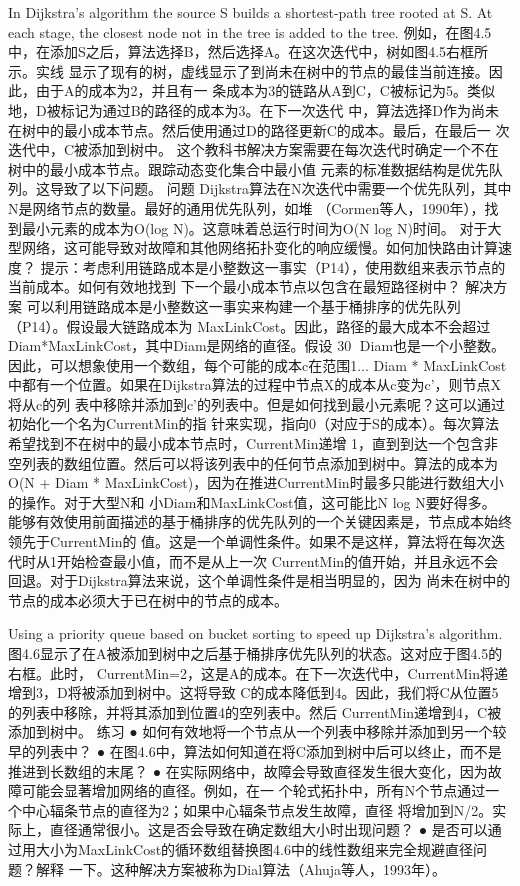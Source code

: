 In Dijkstra’s algorithm the source S builds a shortest-path tree rooted at S. At each stage, the
closest node not in the tree is added to the tree.
例如，在图4.5中，在添加S之后，算法选择B，然后选择A。在这次迭代中，树如图4.5右框所示。实线
显示了现有的树，虚线显示了到尚未在树中的节点的最佳当前连接。因此，由于A的成本为2，并且有一
条成本为3的链路从A到C，C被标记为5。类似地，D被标记为通过B的路径的成本为3。在下一次迭代
中，算法选择D作为尚未在树中的最小成本节点。然后使用通过D的路径更新C的成本。最后，在最后一
次迭代中，C被添加到树中。
这个教科书解决方案需要在每次迭代时确定一个不在树中的最小成本节点。跟踪动态变化集合中最小值
元素的标准数据结构是优先队列。这导致了以下问题。
问题
Dijkstra算法在N次迭代中需要一个优先队列，其中N是网络节点的数量。最好的通用优先队列，如堆
（Cormen等人，1990年），找到最小元素的成本为O(log N)。这意味着总运行时间为O(N log N)时间。
对于大型网络，这可能导致对故障和其他网络拓扑变化的响应缓慢。如何加快路由计算速度？
提示：考虑利用链路成本是小整数这一事实（P14），使用数组来表示节点的当前成本。如何有效地找到
下一个最小成本节点以包含在最短路径树中？
解决方案
可以利用链路成本是小整数这一事实来构建一个基于桶排序的优先队列（P14）。假设最大链路成本为
MaxLinkCost。因此，路径的最大成本不会超过Diam*MaxLinkCost，其中Diam是网络的直径。假设
                                                                                               30
Diam也是一个小整数。因此，可以想象使用一个数组，每个可能的成本c在范围1... Diam *
MaxLinkCost中都有一个位置。如果在Dijkstra算法的过程中节点X的成本从c变为c'，则节点X将从c的列
表中移除并添加到c'的列表中。但是如何找到最小元素呢？这可以通过初始化一个名为CurrentMin的指
针来实现，指向0（对应于S的成本）。每次算法希望找到不在树中的最小成本节点时，CurrentMin递增
1，直到到达一个包含非空列表的数组位置。然后可以将该列表中的任何节点添加到树中。算法的成本为
O(N + Diam * MaxLinkCost)，因为在推进CurrentMin时最多只能进行数组大小的操作。对于大型N和
小Diam和MaxLinkCost值，这可能比N log N要好得多。
能够有效使用前面描述的基于桶排序的优先队列的一个关键因素是，节点成本始终领先于CurrentMin的
值。这是一个单调性条件。如果不是这样，算法将在每次迭代时从1开始检查最小值，而不是从上一次
CurrentMin的值开始，并且永远不会回退。对于Dijkstra算法来说，这个单调性条件是相当明显的，因为
尚未在树中的节点的成本必须大于已在树中的节点的成本。




Using a priority queue based on bucket sorting to speed up Dijkstra’s algorithm.
图4.6显示了在A被添加到树中之后基于桶排序优先队列的状态。这对应于图4.5的右框。此时，
CurrentMin=2，这是A的成本。在下一次迭代中，CurrentMin将递增到3，D将被添加到树中。这将导致
C的成本降低到4。因此，我们将C从位置5的列表中移除，并将其添加到位置4的空列表中。然后
CurrentMin递增到4，C被添加到树中。
练习
 ● 如何有效地将一个节点从一个列表中移除并添加到另一个较早的列表中？
 ● 在图4.6中，算法如何知道在将C添加到树中后可以终止，而不是推进到长数组的末尾？
 ● 在实际网络中，故障会导致直径发生很大变化，因为故障可能会显著增加网络的直径。例如，在一
   个轮式拓扑中，所有N个节点通过一个中心辐条节点的直径为2；如果中心辐条节点发生故障，直径
   将增加到N/2。实际上，直径通常很小。这是否会导致在确定数组大小时出现问题？
 ● 是否可以通过用大小为MaxLinkCost的循环数组替换图4.6中的线性数组来完全规避直径问题？解释
   一下。这种解决方案被称为Dial算法（Ahuja等人，1993年）。

